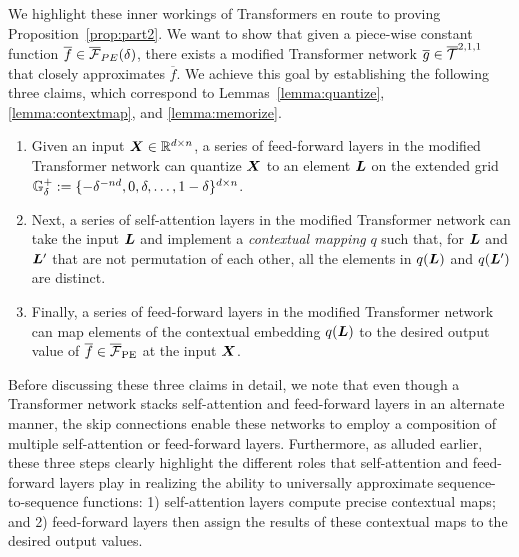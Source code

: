 We highlight these inner workings of Transformers en route to proving Proposition~\ref{prop:part2}. We want to show that given a piece-wise constant function $\overline f \in \overline{\mathcal{F}}_{PE}(\delta)$, there exists a modified Transformer network $\overline{g} \in \overline{\mathcal{T}}^{2, 1, 1}$ that closely approximates $\overline{f}$. We achieve this goal by establishing the following three claims, which correspond to Lemmas~\ref{lemma:quantize}, \ref{lemma:contextmap}, and \ref{lemma:memorize}.
\begin{enumerate}[\hspace{5pt}1.]
\setlength{\itemsep}{2pt}
\item Given an input ${\bm{X}} \in \mathbb{R}^{d \times n}$, a series of feed-forward layers in the modified Transformer network can quantize ${\bm{X}}$ to an element ${\bm{L}}$ on the extended grid ${\mathbb{G}}^+_{\delta} := \{ -\delta^{-nd}, 0, \delta, \dots, 1-\delta \}^{d \times n}$.
\item Next, a series of self-attention layers in the modified Transformer network can take the input ${\bm{L}}$ and implement a {\em contextual mapping} $q$ such that, for ${\bm{L}}$ and ${\bm{L}}'$ that are not permutation of each other, all the elements in $q({\bm{L}})$ and $q({\bm{L}}')$ are distinct.
\item Finally, a series of feed-forward layers in the modified Transformer network can map elements of the contextual embedding $q({\bm{L}})$ to the desired output value of $\overline{f} \in \overline{\mathcal{F}}_{\rm PE}$ at the input ${\bm{X}}$.
\end{enumerate}

Before discussing these three claims in detail, we note that even though a Transformer network stacks self-attention and feed-forward layers in an alternate manner, the skip connections enable these networks to employ a composition of multiple self-attention or feed-forward layers. Furthermore, as alluded earlier, these three steps clearly highlight the different roles that self-attention and feed-forward layers play in realizing the ability to universally approximate sequence-to-sequence functions: 1) self-attention layers compute precise contextual maps; and 2) feed-forward layers then assign the results of these contextual maps to the desired output values. %

